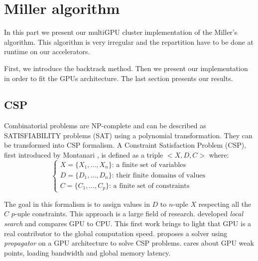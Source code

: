 \section{Miller algorithm}

In this part we present our multiGPU cluster implementation of the Miller's algorithm. 
This algorithm is very irregular and the repartition have to be done at runtime on our accelerators. 

First, we introduce the backtrack method. 
Then we present our implementation in order to fit the GPUs architecture. 
The last section presents our results. 

\subsection{CSP}

Combinatorial problems are NP-complete \cite{GJ79} and can be described as SATISFIABILITY problems (SAT) using a polynomial transformation. 
They can be transformed into CSP formalism.
A Constraint Satisfaction Problem (CSP), first introduced by Montanari \cite{Mon74}, is defined as a triple $<X,D,C>$ where:
\begin{equation}
\begin{cases}
X=\{X_1,...,X_n\}\text{: a finite set of variables} \\ 
D=\{D_1,...,D_n\}\text{: their finite domains of values}\\
C=\{C_1,...,C_p\}\text{: a finite set of constraints}
\end{cases}
\end{equation}

The goal in this formalism is to assign values in $D$ to $n$-uple $X$ respecting all the $C$ $p$-uple constraints.
This approach is a large field of research. \cite{arbelaez2014gpu} developed \textit{local search} and compares GPU to CPU. 
This first work brings to light that GPU is a real contributor to the global computation speed. \cite{campeotto2014exploring} proposes a solver using \textit{propagator} on a GPU architecture to solve CSP problems. 
\cite{jenkins2011lessons} cares about GPU weak points, loading bandwidth and global memory latency.



